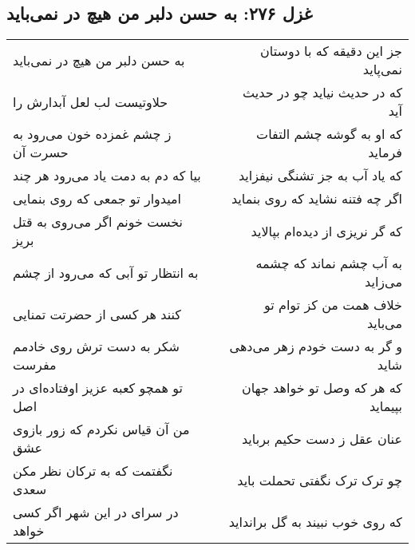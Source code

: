 \begin{center}
\section*{غزل ۲۷۶: به حسن دلبر من هیچ در نمی‌باید}
\label{sec:276}
\begin{longtable}{l p{0.5cm} r}
به حسن دلبر من هیچ در نمی‌باید
&&
جز این دقیقه که با دوستان نمی‌پاید
\\
حلاوتیست لب لعل آبدارش را
&&
که در حدیث نیاید چو در حدیث آید
\\
ز چشم غمزده خون می‌رود به حسرت آن
&&
که او به گوشه چشم التفات فرماید
\\
بیا که دم به دمت یاد می‌رود هر چند
&&
که یاد آب به جز تشنگی نیفزاید
\\
امیدوار تو جمعی که روی بنمایی
&&
اگر چه فتنه نشاید که روی بنماید
\\
نخست خونم اگر می‌روی به قتل بریز
&&
که گر نریزی از دیده‌ام بپالاید
\\
به انتظار تو آبی که می‌رود از چشم
&&
به آب چشم نماند که چشمه می‌زاید
\\
کنند هر کسی از حضرتت تمنایی
&&
خلاف همت من کز توام تو می‌باید
\\
شکر به دست ترش روی خادمم مفرست
&&
و گر به دست خودم زهر می‌دهی شاید
\\
تو همچو کعبه عزیز اوفتاده‌ای در اصل
&&
که هر که وصل تو خواهد جهان بپیماید
\\
من آن قیاس نکردم که زور بازوی عشق
&&
عنان عقل ز دست حکیم برباید
\\
نگفتمت که به ترکان نظر مکن سعدی
&&
چو ترک ترک نگفتی تحملت باید
\\
در سرای در این شهر اگر کسی خواهد
&&
که روی خوب نبیند به گل برانداید
\\
\end{longtable}
\end{center}
